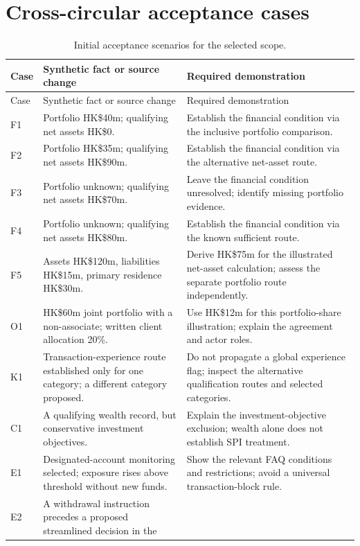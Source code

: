 \documentclass[12pt,a4paper,oneside,openany]{book}
\begin{document}
\section{Cross-circular acceptance cases}
\begingroup\small
\begin{longtable}{P{0.09\textwidth}P{0.41\textwidth}P{0.4\textwidth}}
\caption{Initial acceptance scenarios for the selected scope.}
\label{tab:cases-detail}\\
\toprule Case & Synthetic fact or source change & Required demonstration \\\midrule
\endfirsthead
\toprule Case & Synthetic fact or source change & Required demonstration \\\midrule
\endhead
F1 & Portfolio HK\$40m; qualifying net assets HK\$0. & Establish the financial
condition via the inclusive portfolio comparison.\\
F2 & Portfolio HK\$35m; qualifying net assets HK\$90m. & Establish the financial
condition via the alternative net-asset route.\\
F3 & Portfolio unknown; qualifying net assets HK\$70m. & Leave the financial
condition unresolved; identify missing portfolio evidence.\\
F4 & Portfolio unknown; qualifying net assets HK\$80m. & Establish the financial
condition via the known sufficient route.\\
F5 & Assets HK\$120m, liabilities HK\$15m, primary residence HK\$30m. & Derive
HK\$75m for the illustrated net-asset calculation; assess the separate portfolio
route independently.\\
O1 & HK\$60m joint portfolio with a non-associate; written client allocation 20\%. &
Use HK\$12m for this portfolio-share illustration; explain the agreement and actor roles.\\
K1 & Transaction-experience route established only for one category; a different
category proposed. & Do not propagate a global experience flag; inspect the
alternative qualification routes and selected categories.\\
C1 & A qualifying wealth record, but conservative investment objectives. & Explain
the investment-objective exclusion; wealth alone does not establish SPI treatment.\\
E1 & Designated-account monitoring selected; exposure rises above threshold without
new funds. & Show the relevant FAQ conditions and restrictions; avoid a universal
transaction-block rule.\\
E2 & A withdrawal instruction precedes a proposed streamlined decision in the

\end{longtable}
\end{document}
